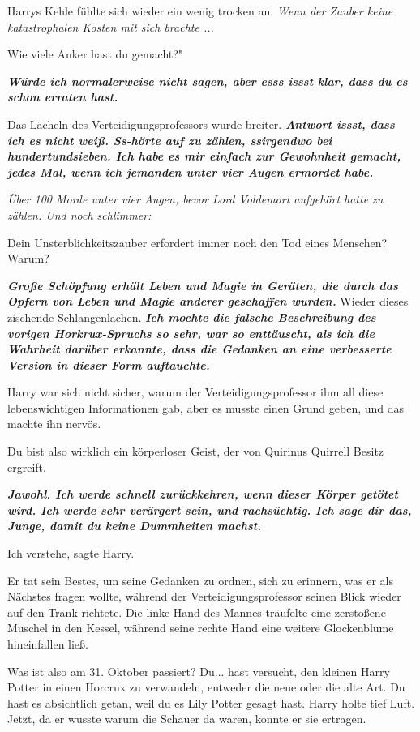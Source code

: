 Harrys Kehle fühlte sich wieder ein wenig trocken an.
\emph{Wenn der Zauber keine katastrophalen Kosten mit sich brachte ...}

\glqq{}Wie viele Anker hast du gemacht?"

\glqq{}\textbf{\emph{Würde ich normalerweise nicht sagen, aber esss issst klar,
dass du es schon erraten hast.}}\grqq{}

Das Lächeln des Verteidigungsprofessors wurde breiter. \glqq
\textbf{\emph{Antwort issst, dass ich es nicht weiß. Ss-hörte auf zu zählen,
ssirgendwo bei hundertundsieben. Ich habe es mir einfach zur Gewohnheit gemacht,
jedes Mal, wenn ich jemanden unter vier Augen ermordet habe.}}\grqq{}

\emph{Über 100 Morde unter vier Augen, bevor Lord Voldemort aufgehört hatte zu
zählen. Und noch schlimmer:}

\glqq{}Dein Unsterblichkeitszauber erfordert immer noch den Tod eines Menschen?
Warum?\grqq{}

\glqq{}\textbf{\emph{Große Schöpfung erhält Leben und Magie in Geräten, die durch
das Opfern von Leben und Magie anderer geschaffen wurden.}}\grqq{} Wieder dieses
zischende Schlangenlachen. \glqq{}\textbf{\emph{Ich mochte die falsche
Beschreibung des vorigen Horkrux-Spruchs so sehr, war so enttäuscht, als ich die
Wahrheit darüber erkannte, dass die Gedanken an eine verbesserte Version in
dieser Form auftauchte.}}\grqq{}

Harry war sich nicht sicher, warum der Verteidigungsprofessor ihm all diese
lebenswichtigen Informationen gab, aber es musste einen Grund geben, und das
machte ihn nervös.

\glqq{}Du bist also wirklich ein körperloser Geist, der von Quirinus Quirrell
Besitz ergreift.\grqq{}

\glqq{}\textbf{\emph{Jawohl. Ich werde schnell zurückkehren, wenn dieser Körper
getötet wird. Ich werde sehr verärgert sein, und rachsüchtig. Ich sage dir das,
Junge, damit du keine Dummheiten machst.}}\grqq{}

\glqq{}Ich verstehe\grqq{}, sagte Harry.

Er tat sein Bestes, um seine Gedanken zu ordnen, sich zu erinnern, was er als
Nächstes fragen wollte, während der Verteidigungsprofessor seinen Blick wieder
auf den Trank richtete. Die linke Hand des Mannes träufelte eine zerstoßene
Muschel in den Kessel, während seine rechte Hand eine weitere Glockenblume
hineinfallen ließ.

\glqq{}Was ist also am 31. Oktober passiert? Du... hast versucht, den kleinen
Harry Potter in einen Horcrux zu verwandeln, entweder die neue oder die alte
Art. Du hast es absichtlich getan, weil du es Lily Potter gesagt hast.\grqq{}
Harry holte tief Luft. Jetzt, da er wusste warum die Schauer da waren, konnte er
sie ertragen.

